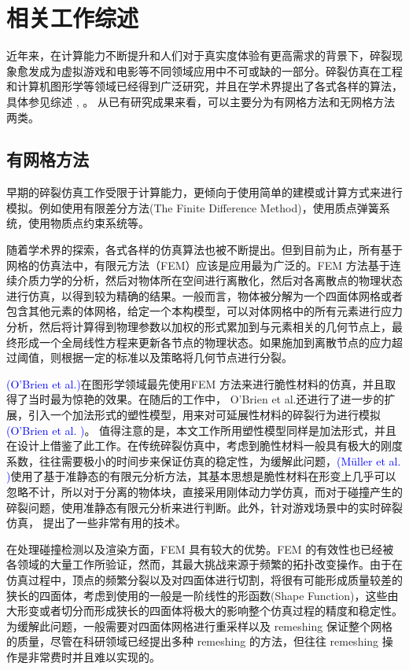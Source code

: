 \section{相关工作综述}
\label{related_work}
近年来，在计算能力不断提升和人们对于真实度体验有更高需求的背景下，碎裂现象愈发成为虚拟游戏和电影等不同领域应用中不可或缺的一部分。碎裂仿真在工程和计算机图形学等领域已经得到广泛研究，并且在学术界提出了各式各样的算法，具体参见综述 , 。 从已有研究成果来看，可以主要分为有网格方法和无网格方法两类。

\subsection{有网格方法}

早期的碎裂仿真工作受限于计算能力，更倾向于使用简单的建模或计算方式来进行模拟。例如使用有限差分方法(The Finite Difference Method)，使用质点弹簧系统，使用物质点约束系统等。

随着学术界的探索，各式各样的仿真算法也被不断提出。但到目前为止，所有基于网格的仿真法中，有限元方法（FEM）应该是应用最为广泛的。FEM 方法基于连续介质力学的分析，然后对物体所在空间进行离散化，然后对各离散点的物理状态进行仿真，以得到较为精确的结果。一般而言，物体被分解为一个四面体网格或者包含其他元素的体网格，给定一个本构模型，可以对体网格中的所有元素进行应力分析，然后将计算得到物理参数以加权的形式累加到与元素相关的几何节点上，最终形成一个全局线性方程来更新各节点的物理状态。如果施加到离散节点的应力超过阈值，则根据一定的标准以及策略将几何节点进行分裂。

\textcolor{blue}{(O'Brien et al.)\parencite{OBrien1999}}在图形学领域最先使用FEM 方法来进行脆性材料的仿真，并且取得了当时最为惊艳的效果。在随后的工作中， O'Brien et al.还进行了进一步的扩展，引入一个加法形式的塑性模型，用来对可延展性材料的碎裂行为进行模拟\textcolor{blue}{(O'Brien et al. )\parencite{OBrien2002}}。 值得注意的是，本文工作所用塑性模型同样是加法形式，并且在设计上借鉴了此工作。在传统碎裂仿真中，考虑到脆性材料一般具有极大的刚度系数，往往需要极小的时间步来保证仿真的稳定性，为缓解此问题，\textcolor{blue}{(M\"{u}ller et al. )\parencite{Muller2001}}使用了基于准静态的有限元分析方法，其基本思想是脆性材料在形变上几乎可以忽略不计，所以对于分离的物体块，直接采用刚体动力学仿真，而对于碰撞产生的碎裂问题，使用准静态有限元分析来进行判断。此外，针对游戏场景中的实时碎裂仿真， 提出了一些非常有用的技术。

在处理碰撞检测以及渲染方面，FEM 具有较大的优势。FEM 的有效性也已经被各领域的大量工作所验证，然而，其最大挑战来源于频繁的拓扑改变操作。由于在仿真过程中，顶点的频繁分裂以及对四面体进行切割，将很有可能形成质量较差的狭长的四面体，考虑到使用的一般是一阶线性的形函数(Shape Function)，这些由大形变或者切分而形成狭长的四面体将极大的影响整个仿真过程的精度和稳定性。为缓解此问题，一般需要对四面体网格进行重采样以及 remeshing 保证整个网格的质量，尽管在科研领域已经提出多种 remeshing 的方法，但往往 remeshing 操作是非常费时并且难以实现的。

